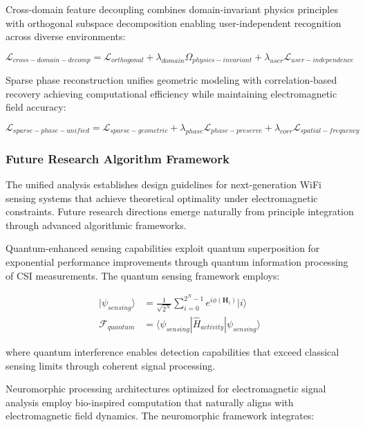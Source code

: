 \documentclass[journal]{IEEEtran}
\begin{document}
Cross-domain feature decoupling combines domain-invariant physics principles with orthogonal subspace decomposition enabling user-independent recognition across diverse environments:

\begin{equation}
\mathcal{L}_{cross-domain-decomp} = \mathcal{L}_{orthogonal} + \lambda_{domain} \Omega_{physics-invariant} + \lambda_{user} \mathcal{L}_{user-independence}
\label{eq:cross_domain_decomp}
\end{equation}

Sparse phase reconstruction unifies geometric modeling with correlation-based recovery achieving computational efficiency while maintaining electromagnetic field accuracy:

\begin{equation}
\mathcal{L}_{sparse-phase-unified} = \mathcal{L}_{sparse-geometric} + \lambda_{phase} \mathcal{L}_{phase-preserve} + \lambda_{corr} \mathcal{L}_{spatial-frequency}
\label{eq:sparse_phase_unified}
\end{equation}

\subsubsection{Future Research Algorithm Framework}

The unified analysis establishes design guidelines for next-generation WiFi sensing systems that achieve theoretical optimality under electromagnetic constraints. Future research directions emerge naturally from principle integration through advanced algorithmic frameworks.

Quantum-enhanced sensing capabilities exploit quantum superposition for exponential performance improvements through quantum information processing of CSI measurements. The quantum sensing framework employs:

\begin{align}
|\psi_{sensing}\rangle &= \frac{1}{\sqrt{2^N}} \sum_{i=0}^{2^N-1} e^{i\phi(\mathbf{H}_i)}|i\rangle \label{eq:quantum_superposition} \\
\mathcal{F}_{quantum} &= \langle\psi_{sensing}|\hat{H}_{activity}|\psi_{sensing}\rangle \label{eq:quantum_expectation}
\end{align}

where quantum interference enables detection capabilities that exceed classical sensing limits through coherent signal processing.

Neuromorphic processing architectures optimized for electromagnetic signal analysis employ bio-inspired computation that naturally aligns with electromagnetic field dynamics. The neuromorphic framework integrates:
\end{document}

